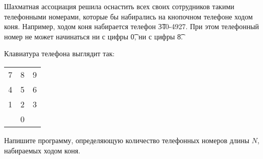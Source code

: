 Шахматная ассоциация решила оснастить всех своих сотрудников такими
телефонными номерами, которые бы набирались на кнопочном телефоне
ходом коня. Например, ходом коня набирается телефон \t{340-4927}. При
этом телефонный номер не может начинаться ни с цифры \t{0}, ни с цифры \t{8}.

Клавиатура телефона выглядит так:

\begin{tabular}{ l c r }
7 & 8 & 9 \\
4 & 5 & 6 \\
1 & 2 & 3 \\
& 0 & \\
\end{tabular}

Напишите программу, определяющую количество телефонных номеров 
длины $N$, набираемых ходом коня.